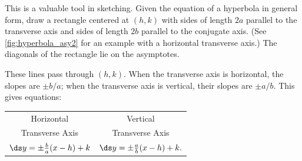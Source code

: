 This is a valuable tool in sketching. Given the equation of a hyperbola in general form, draw a rectangle centered at $(h,k)$ with sides of length $2a$ parallel to the transverse axis and sides of length $2b$ parallel to the conjugate axis. (See \autoref{fig:hyperbola_asy2} for an example with a horizontal transverse axis.) The diagonals of the rectangle lie on the asymptotes. 

These lines pass through $(h,k)$.  When the transverse axis is horizontal, the slopes are $\pm b/a$; when the transverse axis is vertical, their slopes are $\pm a/b$. This gives equations:
\begin{center}
\begin{tabular}{cc}
Horizontal & Vertical \\
Transverse Axis & Transverse Axis \\\addlinespace
$\ds y=\pm\frac ba(x-h)+k$  &$\ds  y=\pm\frac ab(x-h)+k.$
\end{tabular}
\end{center}

